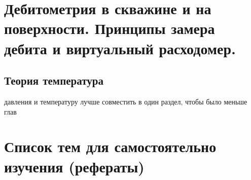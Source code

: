 \documentclass{memoir}
\begin{document}


\chapter{Дебитометрия в скважине и на поверхности. Принципы замера дебита и виртуальный расходомер.}




\section{Теория температура}

давления и температуру лучше совместить в один раздел, чтобы было меньше глав



\chapter{Список тем для самостоятельно изучения (рефераты)}
\end{document}
